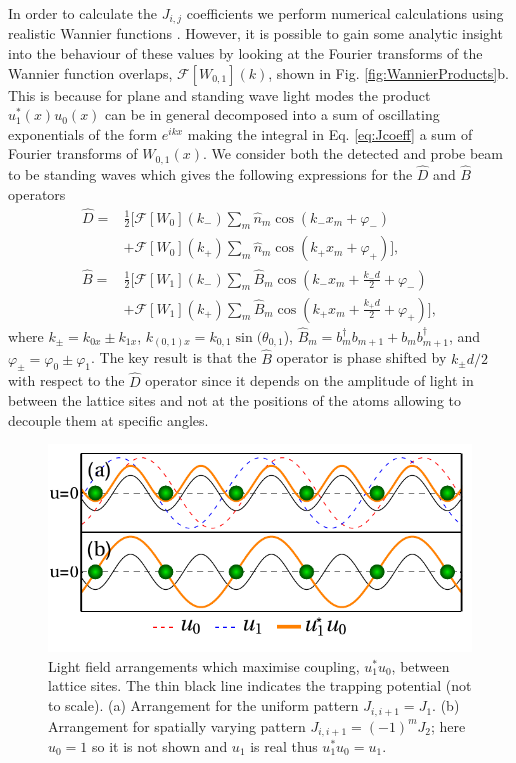 In order to calculate the $J_{i,j}$ coefficients we perform numerical
calculations using realistic Wannier functions
\cite{walters2013}. However, it is possible to gain some analytic
insight into the behaviour of these values by looking at the Fourier
transforms of the Wannier function overlaps,
$\mathcal{F}[W_{0,1}](k)$, shown in Fig.
\ref{fig:WannierProducts}b. This is because for plane and standing
wave light modes the product $u_1^*(x) u_0(x)$ can be in general
decomposed into a sum of oscillating exponentials of the form
$e^{i k x}$ making the integral in Eq. \eqref{eq:Jcoeff} a sum of
Fourier transforms of $W_{0,1}(x)$. We consider both the detected and
probe beam to be standing waves which gives the following expressions
for the $\hat{D}$ and $\hat{B}$ operators
\begin{align}
  \label{eq:FTs}
  \hat{D} = & \frac{1}{2}[\mathcal{F}[W_0](k_-)\sum_m\hat{n}_m\cos(k_-
              x_m +\varphi_-) \nonumber\\ 
            & + \mathcal{F}[W_0](k_+)\sum_m\hat{n}_m\cos(k_+ x_m +\varphi_+)],
              \nonumber\\ 
  \hat{B} = & \frac{1}{2}[\mathcal{F}[W_1](k_-)\sum_m\hat{B}_m\cos(k_- x_m
              +\frac{k_-d}{2}+\varphi_-) \nonumber\\ 
            & +\mathcal{F}[W_1](k_+)\sum_m\hat{B}_m\cos(k_+
              x_m +\frac{k_+d}{2}+\varphi_+)],
\end{align}
where $k_\pm = k_{0x} \pm k_{1x}$,
$k_{(0,1)x} = k_{0,1} \sin(\theta_{0,1}$),
$\hat{B}_m=b^\dag_mb_{m+1}+b_mb^\dag_{m+1}$, and
$\varphi_\pm=\varphi_0 \pm \varphi_1$. The key result is that the
$\hat{B}$ operator is phase shifted by $k_\pm d/2$ with respect to the
$\hat{D}$ operator since it depends on the amplitude of light in
between the lattice sites and not at the positions of the atoms
allowing to decouple them at specific angles.

\begin{figure}[hbtp!]
  \centering
  \includegraphics[width=0.8\linewidth]{BDiagram}
  \caption[Maximising Light-Matter Coupling between Lattice
  Sites]{Light field arrangements which maximise coupling, $u_1^*u_0$,
    between lattice sites. The thin black line indicates the trapping
    potential (not to scale). (a) Arrangement for the uniform pattern
    $J_{i,i+1} = J_1$. (b) Arrangement for spatially varying pattern
    $J_{i,i+1}=(-1)^m J_2$; here $u_0=1$ so it is not shown and $u_1$
    is real thus $u_1^*u_0=u_1$. \label{fig:BDiagram}}
\end{figure}

